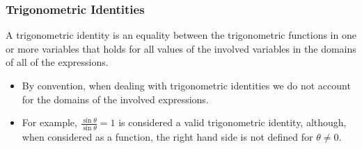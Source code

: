 \begin{frame}
\frametitle{Trigonometric Identities}
\begin{definition}
A trigonometric identity is an equality between the trigonometric functions in one or more variables that holds for all values of the involved variables in the domains of all of the expressions.
\end{definition}
\begin{itemize}
\item<2-> By convention, when dealing with trigonometric identities we do not account for the domains of the involved expressions.
\item<3-> For example, $\frac{\sin\theta}{\sin \theta}=1$ is considered a valid trigonometric identity, although, when considered as a function, the right hand side is not defined for $\theta\neq 0$.
\end{itemize}
\end{frame}

